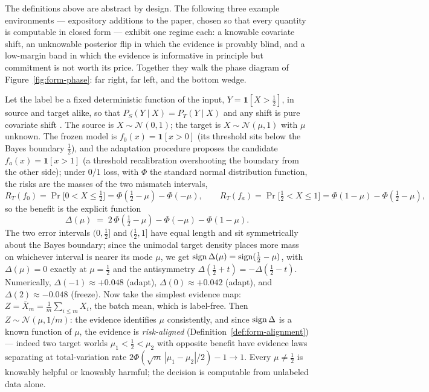 The definitions above are abstract by design. The following three example
environments --- expository additions to the paper, chosen so that every
quantity is computable in closed form --- exhibit one regime each: a
knowable covariate shift, an unknowable posterior flip in which the evidence
is provably blind, and a low-margin band in which the evidence is
informative in principle but commitment is not worth its price. Together
they walk the phase diagram of Figure~\ref{fig:form-phase}: far right, far
left, and the bottom wedge.

\begin{example}\label{ex:form-gauss}
Let the label be a fixed deterministic function of the input,
$Y=\mathbf1[X>\tfrac12]$, in source and target alike, so that
$P_S(Y\mid X)=P_T(Y\mid X)$ and any shift is pure covariate shift
\cite{shimodaira2000improving}. The source is $X\sim\mathcal N(0,1)$; the
target is $X\sim\mathcal N(\mu,1)$ with $\mu$ unknown. The frozen model is
$f_0(x)=\mathbf1[x>0]$ (its threshold sits below the Bayes boundary
$\tfrac12$), and the adaptation procedure proposes the candidate
$f_a(x)=\mathbf1[x>1]$ (a threshold recalibration overshooting the boundary
from the other side); under $0/1$ loss, with $\Phi$ the standard normal
distribution function, the risks are the masses of the two mismatch
intervals,
\[
R_T(f_0)=\Pr\bigl[0<X\le\tfrac12\bigr]=\Phi(\tfrac12-\mu)-\Phi(-\mu),
\qquad
R_T(f_a)=\Pr\bigl[\tfrac12<X\le 1\bigr]=\Phi(1-\mu)-\Phi(\tfrac12-\mu),
\]
so the benefit is the explicit function
\[
\Delta(\mu)\;=\;2\,\Phi(\tfrac12-\mu)-\Phi(-\mu)-\Phi(1-\mu).
\]
The two error intervals $(0,\tfrac12]$ and $(\tfrac12,1]$ have equal length
and sit symmetrically about the Bayes boundary; since the unimodal target
density places more mass on whichever interval is nearer its mode $\mu$, we
get $\operatorname{sign}\Delta(\mu)=\operatorname{sign}(\tfrac12-\mu)$, with $\Delta(\mu)=0$ exactly at
$\mu=\tfrac12$ and the antisymmetry $\Delta(\tfrac12+t)=-\Delta(\tfrac12-t)$.
Numerically, $\Delta(-1)\approx+0.048$ (adapt), $\Delta(0)\approx+0.042$
(adapt), and $\Delta(2)\approx-0.048$ (freeze). Now take the simplest
evidence map: $Z=\bar X_m=\tfrac1m\sum_{i\le m}X_i$, the batch mean, which is
label-free. Then $Z\sim\mathcal N(\mu,1/m)$: the evidence identifies $\mu$
consistently, and since $\operatorname{sign}\Delta$ is a known function of $\mu$, the
evidence is \emph{risk-aligned} (Definition~\ref{def:form-alignment}) ---
indeed two target worlds $\mu_1<\tfrac12<\mu_2$ with opposite benefit have
evidence laws separating at total-variation rate
$2\Phi(\sqrt m\,|\mu_1-\mu_2|/2)-1\to1$. Every $\mu\neq\tfrac12$ is
knowably helpful or knowably harmful; the decision is computable from
unlabeled data alone.
\end{example}

